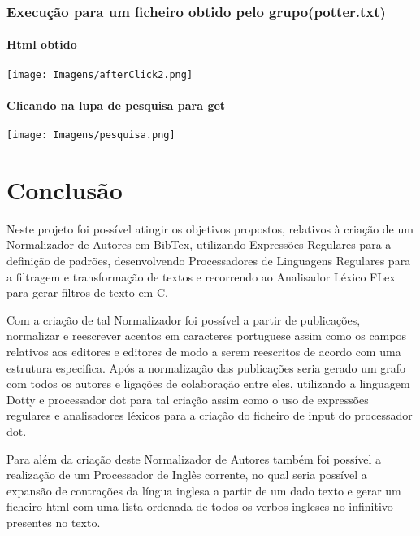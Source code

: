 \documentclass{report}
\begin{document}
\subsection{Execução para um ficheiro obtido pelo grupo(potter.txt)}

\subsubsection{Html obtido}

\texttt{[image: Imagens/afterClick2.png]}

\subsubsection{Clicando na lupa de pesquisa para get}

\texttt{[image: Imagens/pesquisa.png]}




\chapter{Conclusão} \label{concl}
Neste projeto foi possível atingir os objetivos propostos, relativos à criação de 
um Normalizador de Autores em BibTex, utilizando Expressões Regulares para a definição de padrões,
desenvolvendo Processadores de Linguagens Regulares para a filtragem e transformação de textos e 
recorrendo ao Analisador Léxico FLex para gerar filtros de texto em C.\par

Com a criação de tal Normalizador foi possível a partir de publicações, normalizar e reescrever
acentos em caracteres portuguese assim como os campos relativos aos editores e editores de modo
a serem reescritos de acordo com uma estrutura especifica. Após a normalização das publicações seria
gerado um grafo com todos os autores e ligações de colaboração entre eles, utilizando a linguagem Dotty
e processador dot para tal criação assim como o uso de expressões regulares e analisadores léxicos para
a criação do ficheiro de input do processador dot.\par

Para além da criação deste Normalizador de Autores também foi possível a realização de um Processador
de Inglês corrente, no qual seria possível a expansão de contrações da língua inglesa a partir de um dado 
texto e gerar um ficheiro html com uma lista ordenada de todos os verbos ingleses no infinitivo 
presentes no texto.\par
\end{document}
